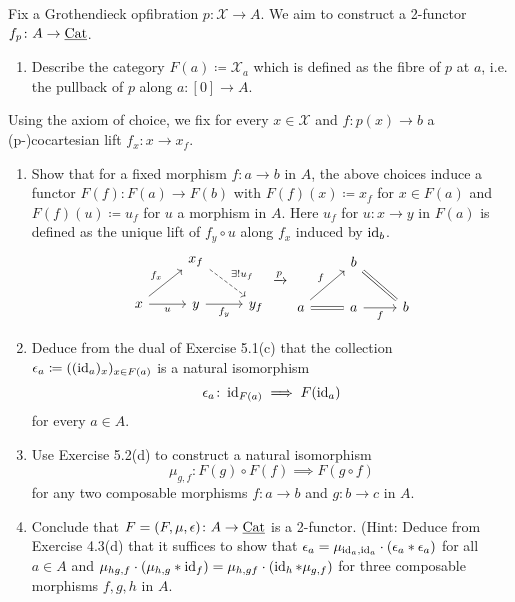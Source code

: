 \begin{Exercise}
	Fix a Grothendieck opfibration $ p \colon \mathcal{ X } \to A $.
	We aim to construct a 2-functor $ f_p \colon A \to \underline{ \operatorname{Cat} } $.
	\begin{enumerate}[label=(\alph*)]
		\item 
		Describe the category $ F ( a ) \coloneqq \mathcal{ X }_a $ which is defined as the fibre of $ p $ at $ a $, i.e. the pullback of $ p $ along $ a \colon [ 0 ] \to  A $.
	\end{enumerate}
	
	Using the axiom of choice, we fix for every $ x \in \mathcal{ X } $ and $ f \colon p ( x ) \to b $ a (p-)cocartesian lift $ f_x \colon x \to x_f $.
	
	\begin{enumerate}[resume, label=(\alph*)]
		\item 
		Show that for a fixed morphism $ f \colon a \to b $ in $ A $, the above choices induce a functor $ F ( f ) \colon F ( a ) \to F ( b ) $ with $ F ( f ) ( x ) \coloneqq x_f $ for $ x \in F ( a ) $ and $ F ( f ) ( u ) \coloneqq u_f $ for $ u $ a morphism in $ A $.
		Here $ u_f $ for $ u \colon x \to y $ in $ F ( a ) $ is defined as the unique lift of $ f_y \circ u $ along $ f_x $ induced by $ \operatorname{id}_b $.
		\[
		\begin{tikzcd}
			&
			x_f
			\ar[rd, dashed, "\exists! u_f "]
			\\
			x
			\ar[ru, "f_x"]
			\ar[r, "u"']
			&
			y
			\ar[r,"f_y"']
			&
			y_f
		\end{tikzcd}
		\xrightarrow{ p }
		\begin{tikzcd}
			& 
			b
			\ar[rd, equal]
			\\
			a
			\ar[ru, " f "]
			\ar[r, equal]
			&
			a
			\ar[r, "f"']
			&
			b
		\end{tikzcd}
		\]
		
		\item 
		Deduce from the dual of Exercise 5.1(c) that the collection $\epsilon_a \coloneqq ( ( \operatorname{id}_a )_x )_{x \in F ( a ) } $ is a natural isomorphism
		\[
		\epsilon_a \colon \operatorname{id}_{ F ( a ) } \implies F ( \operatorname{id}_a )
		\]
		for every $ a \in A $.
		
		\item 
		Use Exercise 5.2(d) to construct a natural isomorphism 
		\[
		\mu_{g,f} \colon F ( g ) \circ F ( f ) \implies F ( g \circ f )
		\]
		for any two composable morphisms $ f \colon a \to b $ and $ g \colon b \to c $ in $ A $.
		
		\item 
		Conclude that $ F = ( F , \mu , \epsilon ) \colon A \to \underline{\operatorname{Cat}} $ is a 2-functor.
		(Hint: Deduce from Exercise 4.3(d) that it suffices to show that $ \epsilon_a = \mu_{ \operatorname{id}_a , \operatorname{id}_a } \cdot ( \epsilon_a * \epsilon_a ) $ for all $ a \in A $ and $ \mu_{ hg , f } \cdot ( \mu_{h,g} * \operatorname{id}_f ) = \mu_{ h , gf }  \cdot ( \operatorname{id}_h * \mu_{ g ,f } )$ for three composable morphisms $ f , g , h $ in $ A $.
	\end{enumerate}
\end{Exercise}

